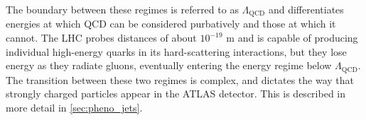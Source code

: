 The boundary between these regimes is referred to as $\Lambda_\text{QCD}$ and differentiates energies at which \ac{QCD} can be considered purbatively and those at which it cannot. The \ac{LHC} probes distances of about $10^{-19}$ m and is capable of producing individual high-energy quarks in its hard-scattering interactions, but they lose energy as they radiate gluons, eventually entering the energy regime below $\Lambda_\text{QCD}$. The transition between these two regimes is complex, and dictates the way that strongly charged particles appear in the \ac{ATLAS} detector. This is described in more detail in \autoref{sec:pheno_jets}.









